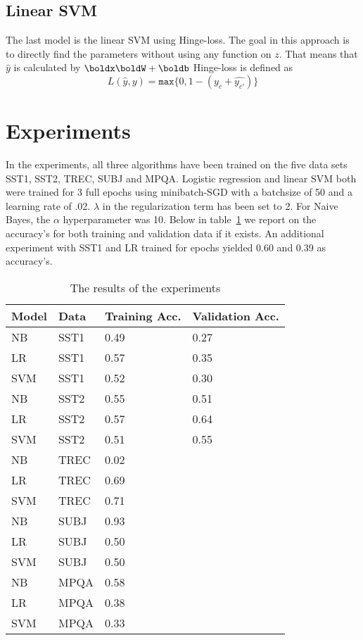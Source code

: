 \documentclass[11pt]{article}
\begin{document}
\subsection{Linear SVM}

The last model is the linear SVM using Hinge-loss. The goal in this approach is to directly find the parameters without using any function on $z$. That means that $\hat{y}$ is calculated by $\boldx\boldW+\boldb$
Hinge-loss is defined as $$L(\hat{y},y)=\texttt{max}\{0, 1 - (\hat{y_c}+\hat{y_{c'}})\}$$ 

\section{Experiments}

In the experiments, all three algorithms have been trained on the five data sets SST1, SST2, TREC, SUBJ and MPQA.
Logistic regression and linear SVM both were trained for 3 full epochs using minibatch-SGD with a batchsize of 50 and a learning rate of .02. $\lambda$ in the regularization term has been set to 2. 
For Naive Bayes, the $\alpha$ hyperparameter was 10.
Below in table~\ref{tab:results} we report on the accuracy's for both training and validation data if it exists. An additional experiment with SST1 and LR trained for epochs yielded 0.60 and 0.39 as accuracy's.

\begin{table}[]
\centering
\caption{The results of the experiments}
\label{tab:results}
\begin{tabular}{llll}
\hline
Model & Data & Training Acc. &  Validation Acc.\\ \hline
NB  & SST1  & 0.49 & 0.27 \\
LR  & SST1  & 0.57 & 0.35 \\
SVM & SST1  & 0.52 & 0.30 \\ 
NB  & SST2  & 0.55 & 0.51 \\
LR  & SST2  & 0.57 & 0.64 \\
SVM & SST2  & 0.51 & 0.55 \\
NB  & TREC  & 0.02 &  \\
LR  & TREC  & 0.69 &  \\
SVM & TREC  & 0.71 &  \\
NB  & SUBJ  & 0.93 &  \\
LR  & SUBJ  & 0.50 &  \\
SVM & SUBJ  & 0.50 &  \\
NB  & MPQA  & 0.58 &  \\
LR  & MPQA  & 0.38 &  \\
SVM & MPQA  & 0.33 &  \\ \hline
\end{tabular}
\end{table}
\end{document}
